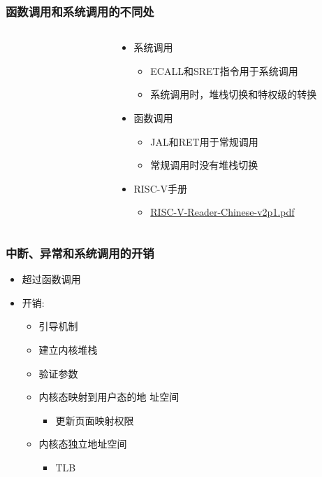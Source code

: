 \begin{frame}
	\frametitle{函数调用和系统调用的不同处}
    \begin{columns}
    \begin{column}{0.5\textwidth}
        \begin{figure}
        \end{figure}
    \end{column}
    \begin{column}{0.5\textwidth}
	    \begin{itemize}
	        \item 系统调用
		    \begin{itemize}
	        	\item ECALL和SRET指令用于系统调用
	        	\item 系统调用时，堆栈切换和特权级的转换
	    	\end{itemize}
	        \item 函数调用
		    \begin{itemize}
	        	\item JAL和RET用于常规调用
	        	\item 常规调用时没有堆栈切换
	    	\end{itemize}

	        \item RISC-V手册
		    \begin{itemize}
	        	\item \href{http://crva.ict.ac.cn/documents/RISC-V-Reader-Chinese-v2p1.pdf}{RISC-V-Reader-Chinese-v2p1.pdf}
	    	\end{itemize}
	    \end{itemize}
    \end{column}
    \end{columns}
\end{frame}
\begin{frame}
	\frametitle{中断、异常和系统调用的开销}
	\begin{itemize}
        \item 超过函数调用
        \item 开销:
	    \begin{itemize}
	        \item 引导机制
	        \item 建立内核堆栈
	        \item 验证参数
	        \item 内核态映射到用户态的地 址空间
		    \begin{itemize}
	        	\item 更新页面映射权限
	    	\end{itemize}
        	\item 内核态独立地址空间
		    \begin{itemize}
        		\item TLB
	    	\end{itemize}
    	\end{itemize}
	\end{itemize}
\end{frame}

